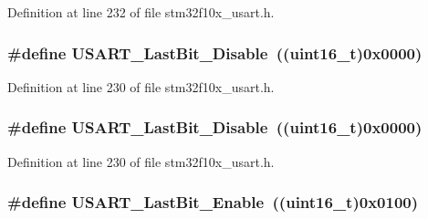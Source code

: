 Definition at line 232 of file stm32f10x\+\_\+usart.\+h.

\subsubsection[{\texorpdfstring{U\+S\+A\+R\+T\+\_\+\+Last\+Bit\+\_\+\+Disable}{USART_LastBit_Disable}}]{\setlength{\rightskip}{0pt plus 5cm}\#define U\+S\+A\+R\+T\+\_\+\+Last\+Bit\+\_\+\+Disable~(({\bf uint16\+\_\+t})0x0000)}\hypertarget{group___u_s_a_r_t___last___bit_ga129c89b9e0dbb3ce43ee92589b3324e5}{}\label{group___u_s_a_r_t___last___bit_ga129c89b9e0dbb3ce43ee92589b3324e5}


Definition at line 230 of file stm32f10x\+\_\+usart.\+h.

\subsubsection[{\texorpdfstring{U\+S\+A\+R\+T\+\_\+\+Last\+Bit\+\_\+\+Disable}{USART_LastBit_Disable}}]{\setlength{\rightskip}{0pt plus 5cm}\#define U\+S\+A\+R\+T\+\_\+\+Last\+Bit\+\_\+\+Disable~(({\bf uint16\+\_\+t})0x0000)}\hypertarget{group___u_s_a_r_t___last___bit_ga129c89b9e0dbb3ce43ee92589b3324e5}{}\label{group___u_s_a_r_t___last___bit_ga129c89b9e0dbb3ce43ee92589b3324e5}


Definition at line 230 of file stm32f10x\+\_\+usart.\+h.

\subsubsection[{\texorpdfstring{U\+S\+A\+R\+T\+\_\+\+Last\+Bit\+\_\+\+Enable}{USART_LastBit_Enable}}]{\setlength{\rightskip}{0pt plus 5cm}\#define U\+S\+A\+R\+T\+\_\+\+Last\+Bit\+\_\+\+Enable~(({\bf uint16\+\_\+t})0x0100)}\hypertarget{group___u_s_a_r_t___last___bit_gaf8c19d1ce01c6efff8c24ee82cc7b52e}{}\label{group___u_s_a_r_t___last___bit_gaf8c19d1ce01c6efff8c24ee82cc7b52e}


